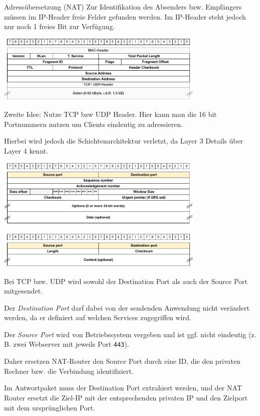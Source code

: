\begin{defi}{Adressübersetzung (NAT)}
    Zur Identifikation des Absenders bzw. Empfängers müssen im IP-Header freie Felder gefunden werden.
    Im IP-Header steht jedoch nur noch 1 freies Bit zur Verfügung.

    \begin{center}
        \includegraphics[width=0.75\textwidth]{includes/figures/defi_ip_header.pdf}
    \end{center}

    Zweite Idee: Nutze TCP bzw UDP Header.
    Hier kann man die 16 bit Portnummern nutzen um Clients eindeutig zu adressieren.

    Hierbei wird jedoch die Schichtenarchitektur verletzt, da Layer 3 Details über Layer 4 kennt.

    \begin{center}
        \includegraphics[width=0.75\textwidth]{includes/figures/defi_tcp_header_port.pdf}

        \includegraphics[width=0.75\textwidth]{includes/figures/defi_udp_header_port.pdf}
    \end{center}

    Bei TCP bzw. UDP wird sowohl der Destination Port als auch der Source Port mitgesendet.

    Der \emph{Destination Port} darf dabei von der sendenden Anwendung nicht verändert werden, da er definiert auf welchen Services zugegriffen wird.

    Der \emph{Source Port} wird von Betriebssystem vergeben und ist ggf. nicht eindeutig (z. B. zwei Webserver mit jeweils Port \texttt{443}).

    Daher ersetzen NAT-Router den Source Port durch eine ID, die den privaten Rechner bzw. die Verbindung identifiziert.

    Im Antwortpaket muss der Destination Port extrahiert werden, und der NAT Router ersetzt die Ziel-IP mit der entsprechenden privaten IP und den Zielport mit dem ursprünglichen Port.
\end{defi}

